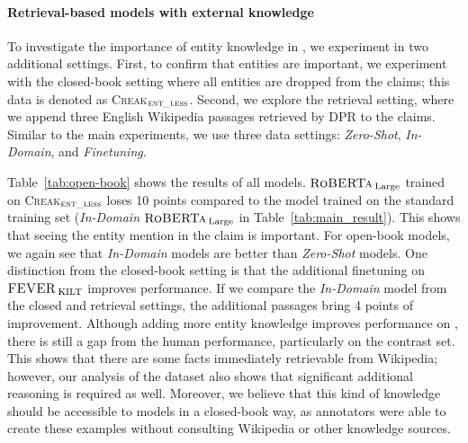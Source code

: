 \paragraph{Retrieval-based models with external knowledge}
To investigate the importance of entity knowledge in \textsc{\ours}, we experiment in two additional settings. First, to confirm that entities are important, we experiment with the closed-book setting where all entities are dropped from the claims; this data is denoted as \textsc{Creak}$_\textsc{ent\_less}$. Second, we explore the retrieval setting, where we append three English Wikipedia passages retrieved by DPR to the claims. Similar to the main experiments, we use three data settings: \emph{Zero-Shot}, \emph{In-Domain}, and \emph{Finetuning}. 

Table~\ref{tab:open-book} shows the results of all models. $\textsc{RoBERTa}_{\:\text{Large}}$ trained on \textsc{Creak}$_\textsc{ent\_less}$ loses 10 points compared to the model trained on the standard \textsc{\ours} training set (\emph{In-Domain} $\textsc{RoBERTa}_{\:\text{Large}}$ in Table~\ref{tab:main_result}). This shows that seeing the entity mention in the claim is important. For open-book models, we again see that \emph{In-Domain} models are better than \emph{Zero-Shot} models. One distinction from the closed-book setting is that the additional finetuning on $\textsc{FEVER}_{\:\text{KILT}}$ improves performance. If we compare the \emph{In-Domain} model from the closed and retrieval settings, the additional passages bring 4 points of improvement. Although adding more entity knowledge improves performance on \textsc{\oursno}, there is still a gap from the human performance, particularly on the contrast set. This shows that there are some facts immediately retrievable from Wikipedia; however, our analysis of the dataset also shows that significant additional reasoning is required as well. Moreover, we believe that this kind of knowledge should be accessible to models in a closed-book way, as annotators were able to create these examples without consulting Wikipedia or other knowledge sources. 

